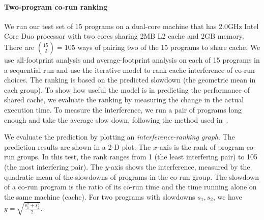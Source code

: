\paragraph{Two-program co-run ranking}
\label{sec:2-corun}
We run our test set of 15 programs on a dual-core machine that has
2.0GHz Intel Core Duo processor with two cores sharing 2MB L2 cache
and 2GB memory.  There are ${15 \choose 2} = 105$ ways of
pairing two of the 15 programs to share cache. We use all-footprint
analysis and average-footprint analysis on each of 15 programs in a
sequential run and use the iterative model to rank cache interference
of co-run choices.  The ranking is based on the predicted slowdown
(the geometric mean in each group). To show how useful the model is in
predicting the performance of shared cache, we evaluate the ranking by
measuring the change in the actual execution time. To measure the
interference, we run a pair of programs long enough and take the
average slow down, following the method used in~\cite{Zhang+:EuroSys09}. 

We evaluate the prediction by plotting an \emph{interference-ranking
  graph}. The prediction results are shown in a 2-D plot.  The
$x$-axis is the rank of program co-run groups.  In this test, the rank
ranges from 1 (the least interfering pair) to 105 (the most
interfering pair).  The $y$-axis shows the interference, measured by
the quadratic mean of the slowdowns of programs in the co-run group.
The slowdown of a co-run program is the ratio of its co-run time and
the time running alone on the same machine (cache).  For two programs
with slowdowns $s_1,s_2$, we have $y = \sqrt{ \frac{s_1^2 + s_2^2}{2}}$.

